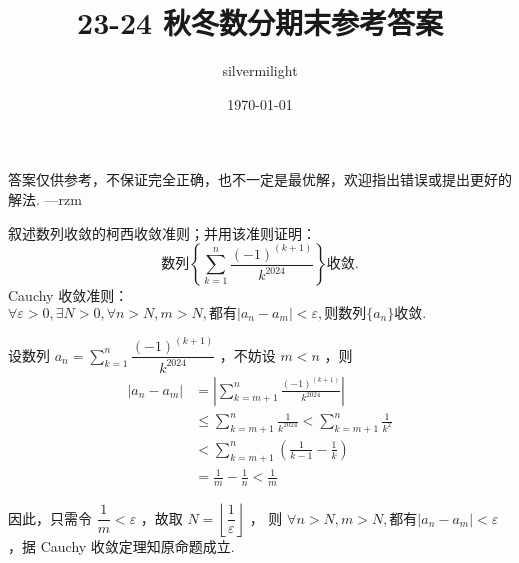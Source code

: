 \documentclass{jhwhw}
\title{23-24 秋冬数分期末参考答案}
\author{silvermilight}
\date{\today}
\begin{document}
    答案仅供参考，不保证完全正确，也不一定是最优解，欢迎指出错误或提出更好的解法. ---rzm

        叙述数列收敛的柯西收敛准则；并用该准则证明：
        \[
            \text{数列} \left\{ \sum_{k=1}^n \frac{(-1)^{(k+1)}}{k^{2024}} \right\}
            \text{收敛.}
        \]
    \solution
        Cauchy 收敛准则：
        \(
            \forall\varepsilon>0,\exists N>0,\forall n>N,m>N,
            \text{都有} |a_n-a_m|<\varepsilon,
            \text{则数列} \{a_n\} \text{收敛.}
        \)

        设数列 $a_n=\sum\limits_{k=1}^n \dfrac{(-1)^{(k+1)}}{k^{2024}}$ ，不妨设 $m<n$ ，则
        \begin{align*}
            |a_n-a_m| &= \left| \sum_{k=m+1}^n \frac{(-1)^{(k+1)}}{k^{2024}} \right| \\
                      &\leq \sum_{k=m+1}^n \frac{1}{k^{2024}}
                      < \sum_{k=m+1}^n \frac{1}{k^2} \\
                      &< \sum_{k=m+1}^n \left( \frac{1}{k-1}-\frac{1}{k} \right) \\
                      &= \frac{1}{m}-\frac{1}{n}
                      < \frac{1}{m}
        \end{align*}

        因此，只需令 $\dfrac{1}{m}<\varepsilon$ ，故取 $N=\left\lfloor \dfrac{1}{\varepsilon} \right\rfloor$ ，
        则 $\forall n>N,m>N,\text{都有}|a_n-a_m|<\varepsilon$，据 Cauchy 收敛定理知原命题成立.
    
\end{document}
